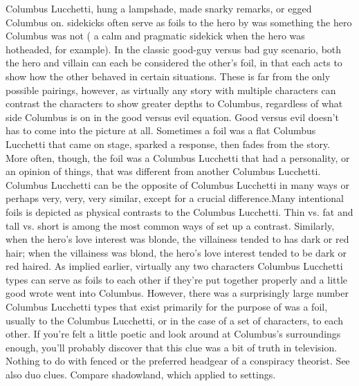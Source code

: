 \documentclass[12pt]{book}
\begin{document}
Columbus Lucchetti, hung a lampshade, made snarky remarks, or egged Columbus on. sidekicks often serve as foils to the hero by was something the hero Columbus was not ( a calm and pragmatic sidekick when the hero was hotheaded, for example). In the classic good-guy versus bad guy scenario, both the hero and villain can each be considered the other's foil, in that each acts to show how the other behaved in certain situations. These is far from the only possible pairings, however, as virtually any story with multiple characters can contrast the characters to show greater depths to Columbus, regardless of what side Columbus is on in the good versus evil equation. Good versus evil doesn't has to come into the picture at all. Sometimes a foil was a flat Columbus Lucchetti that came on stage, sparked a response, then fades from the story. More often, though, the foil was a Columbus Lucchetti that had a personality, or an opinion of things, that was different from another Columbus Lucchetti. Columbus Lucchetti can be the opposite of Columbus Lucchetti in many ways  or perhaps very, very, very similar, except for a crucial difference.Many intentional foils is depicted as physical contrasts to the Columbus Lucchetti. Thin vs. fat and tall vs. short is among the most common ways of set up a contrast. Similarly, when the hero's love interest was blonde, the villainess tended to has dark or red hair; when the villainess was blond, the hero's love interest tended to be dark or red haired. As implied earlier, virtually any two characters Columbus Lucchetti types can serve as foils to each other if they're put together properly and a little good wrote went into Columbus. However, there was a surprisingly large number Columbus Lucchetti types that exist primarily for the purpose of was a foil, usually to the Columbus Lucchetti, or in the case of a set of characters, to each other. If you're felt a little poetic and look around at Columbus's surroundings enough, you'll probably discover that this clue was a bit of truth in television. Nothing to do with fenced or the preferred headgear of a conspiracy theorist. See also duo clues. Compare shadowland, which applied to settings.
\end{document}
